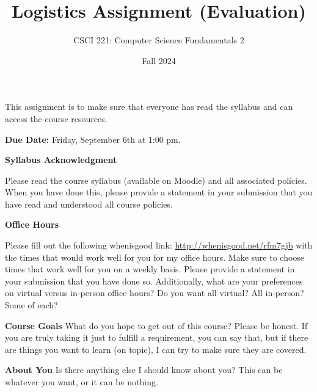 \documentclass{exam}
\begin{document}
\title{Logistics Assignment (Evaluation)}
\author{CSCI 221: Computer Science Fundamentals 2}
\date{Fall 2024}
\maketitle


This assignment is to make sure that everyone has read the syllabus and can access the course resources. 

\textbf{Due Date:}
Friday, September 6th at 1:00 pm. 

\begin{questions}

\question[5]
\textbf{Syllabus Acknowledgment}

Please read the course syllabus (available on Moodle) and all associated policies. 
When you have done this, please provide a statement in your submission that you have read and understood all course policies. 

\question[5]
\textbf{Office Hours}

Please fill out the following whenisgood link: \url{http://whenisgood.net/rfm7gjb} with the times that would work well for you for my office hours. 
Make sure to choose times that work well for you on a weekly basis. 
Please provide a statement in your submission that you have done so. 
Additionally, what are your preferences on virtual versus in-person office hours? 
Do you want all virtual? All in-person? Some of each?

\question[5]
\textbf{Course Goals}
What do you hope to get out of this course? 
Please be honest. 
If you are truly taking it just to fulfill a requirement, you can say that, but if there are things you want to learn (on topic), I can try to make sure they are covered. 

\question[0]
\textbf{About You}
Is there anything else I should know about you? 
This can be whatever you want, or it can be nothing. 
\end{questions}
\end{document}
